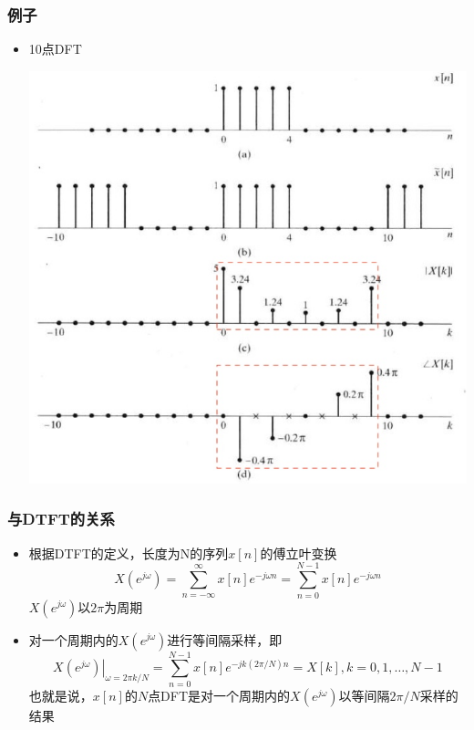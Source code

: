 \documentclass[CJKutf8,xcolor=pdftex,dvipsnames,table]{beamer}
\begin{document}
\begin{CJK*}{UTF8}{song}
  \begin{frame}
    \frametitle{例子}
    \begin{itemize}
	\item 10点DFT
		\begin{center}
      	\includegraphics[scale=.35]{dtsp-c-f8-11}
    	\end{center}	
	\end{itemize}
  \end{frame}  

  \begin{frame}
    \frametitle{与DTFT的关系}
    \begin{itemize}
	\item 根据DTFT的定义，长度为N的序列$x[n]$的傅立叶变换
	\[
		X(e^{j\omega}) = \sum_{n=-\infty}^{\infty}x[n]e^{-j\omega n} =  \sum_{n=0}^{N-1}x[n]e^{-j\omega n} 	
	\]
	$X(e^{j\omega})$以$2\pi$为周期
	\item 对一个周期内的$X(e^{j\omega})$进行等间隔采样，即
	\[
	\left. X(e^{j\omega}) \right\rvert_{\omega=2\pi k/N}	 = \sum_{n=0}^{N-1}x[n]e^{-jk(2\pi /N) n} = X[k], k=0, 1, \hdots, N-1
	\]	
	也就是说，{\color{red}$x[n]$的$N$点DFT是对一个周期内的$X(e^{j\omega})$以等间隔$2\pi/N$采样的结果}

	\end{itemize}
  \end{frame}      
    

\end{CJK*}
\end{document}
